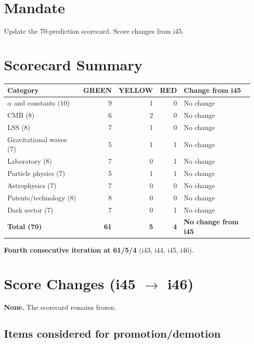 \documentclass[11pt,a4paper]{article}
\newcommand{\GREEN}{\textcolor{dfdgreen}{\textbf{GREEN}}}
\newcommand{\YELLOW}{\textcolor{dfdyellow}{\textbf{YELLOW}}}
\newcommand{\RED}{\textcolor{dfdred}{\textbf{RED}}}
\begin{document}
\section{Mandate}

Update the 70-prediction scorecard. Score changes from i45.

\section{Scorecard Summary}

\begin{center}
\begin{tabular}{lrrrl}
\toprule
\textbf{Category} & \textbf{\GREEN} & \textbf{\YELLOW} & \textbf{\RED} & \textbf{Change from i45} \\
\midrule
$\alpha$ and constants (10) & 9 & 1 & 0 & No change \\
CMB (8) & 6 & 2 & 0 & No change \\
LSS (8) & 7 & 1 & 0 & No change \\
Gravitational waves (7) & 5 & 1 & 1 & No change \\
Laboratory (8) & 7 & 0 & 1 & No change \\
Particle physics (7) & 5 & 1 & 1 & No change \\
Astrophysics (7) & 7 & 0 & 0 & No change \\
Patents/technology (8) & 8 & 0 & 0 & No change \\
Dark sector (7) & 7 & 0 & 1 & No change \\
\midrule
\textbf{Total (70)} & \textbf{61} & \textbf{5} & \textbf{4} & \textbf{No change from i45} \\
\bottomrule
\end{tabular}
\end{center}

\textbf{Fourth consecutive iteration at 61/5/4} (i43, i44, i45, i46).

\section{Score Changes (i45 $\to$ i46)}

\textbf{None.} The scorecard remains frozen.

\subsection{Items considered for promotion/demotion}
\end{document}
